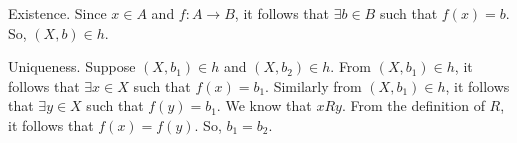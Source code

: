 \documentclass{article}
\begin{document}
Existence. Since $x \in A$ and $f: A \to B$, it follows that $\exists
b \in B$ such that $f(x) = b$. So, $(X,b) \in h$.

Uniqueness. Suppose $(X,b_1) \in h$ and $(X, b_2) \in h$. From $(X,
b_1) \in h$, it follows that $\exists x \in X$ such that $f(x)=b_1$.
Similarly from $(X,b_1) \in h$, it follows that $\exists y \in X$ such
that $f(y)=b_1$. We know that $xRy$. From the definition of $R$, it
follows that $f(x) = f(y)$. So, $b_1 = b_2$.
\end{document}
